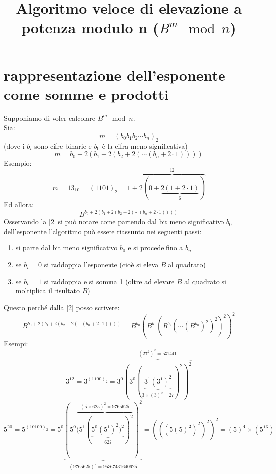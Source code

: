 \documentclass[14pt,a4paper]{article}
\title{Algoritmo veloce di elevazione a potenza modulo n ($ B^m \mod n $)}
\begin{document}
	\maketitle
\section{rappresentazione dell'esponente come somme e prodotti}	
	Supponiamo di voler calcolare $ B^m \mod n $.\\
	Sia:
%	
%	
%	
	\[ m=(b_0b_1b_2\cdots b_n)_2 \] (dove i $ b_i $ sono cifre binarie e $ b_0 $ è la cifra meno significativa)
	\[ m=b_0+2(b_1+2(b_2+2(\cdots (b_n+2\cdot 1)))) \]
	Esempio:
	\begin{equation}
		m=13_{10}=(1101)_2 =1+\overbrace{2(0+\underbrace{2(1+2\cdot 1)}_6)}^{12} \label{1}
	\end{equation}
	\[  \]
	Ed allora:
	\begin{equation}
		B^{b_0+2(b_1+2(b_2+2(\cdots (b_n+2\cdot 1))))} \label{2}
	\end{equation}
	\[  \]
	Osservando la \eqref{2} si può notare come partendo dal bit meno significativo $ b_0 $ dell'esponente l'algoritmo può essere riassunto nei seguenti passi:
	\begin{enumerate}
		\item si parte dal bit meno significativo $ b_0 $  e si procede fino a $ b_n $ 
		\item se $ b_i=0 $ si raddoppia l'esponente (cioè si eleva $ B $ al quadrato)
		\item se $ b_i=1 $ si raddoppia e si somma 1 (oltre ad elevare $ B $ al quadrato si moltiplica il risultato $ B $)
	\end{enumerate}
Questo perché dalla \eqref{2} posso scrivere:
 	\begin{equation}
 		B^{b_0+2(b_1+2(b_2+2(\cdots (b_n+2\cdot 1))))}=B^{b_0}(B^{b_1}(B^{b_2}(\cdots (B^{b_n})^2)^2)^2)^2
 	\end{equation}
 Esempi:
 \begin{equation}
 	3^{12}=3^{(1100)_2}=3^0\overbrace{(3^0(\underbrace{3^1(3^1)^2}_{3\times (3)^2=27})^2)^2}^{(27^2)^2=531441}
 \end{equation}
\[ 5^{20}=5^{(10100)_2} =5^0\underbrace{(5^0\overbrace{(5^1(\underbrace{5^0(5^1)^2)^2}_{625})^2}^{(5\times 625)^2=9765625})^2}_{(9765625)^2=95367431640625}=(((5(5)^2)^2)^2)^2=(5)^4\times (5^{16})\]
\end{document}
